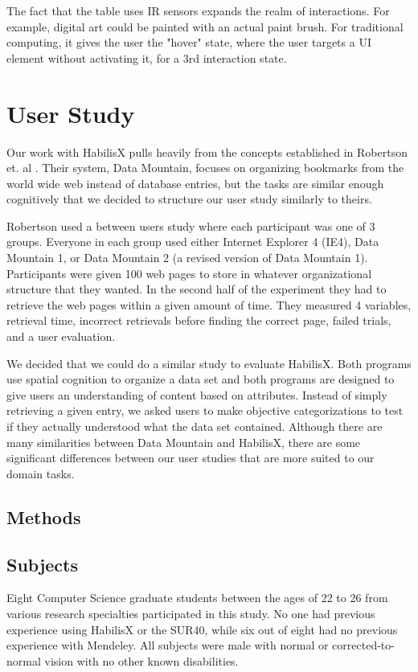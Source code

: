 \documentclass{article}
\begin{document}
The fact that the table uses IR sensors expands the realm of interactions.  For example, digital art could be painted with an actual paint brush.  For traditional computing, it gives the user the "hover" state, where the user targets a UI element without activating it, for a 3rd interaction state.  

\section{User Study}

Our work with HabilisX pulls heavily from the concepts established in Robertson et. al \cite{Robertson1998}.  Their system, Data Mountain, focuses on organizing bookmarks from the world wide web instead of database entries, but the tasks are similar enough cognitively that we decided to structure our user study similarly to theirs.  

Robertson used a between users study where each participant was one of 3 groups.  Everyone in each group used either Internet Explorer 4 (IE4), Data Mountain 1, or Data Mountain 2 (a revised version of Data Mountain 1).  Participants were given 100 web pages to store in whatever organizational structure that they wanted.  In the second half of the experiment they had to retrieve the web pages within a given amount of time.  They measured 4 variables, retrieval time, incorrect retrievals before finding the correct page, failed trials, and a user evaluation.  

We decided that we could do a similar study to evaluate HabilisX.  Both programs use spatial cognition to organize a data set and both programs are designed to give users an understanding of content based on attributes.  Instead of simply retrieving a given entry, we asked users to make objective categorizations to test if they actually understood what the data set contained.  Although there are many similarities between Data Mountain and HabilisX, there are some significant differences between our user studies that are more suited to our domain tasks.   








\subsection{Methods}
\subsection*{Subjects}
	Eight Computer Science graduate students between the ages of 22 to 26 from various research specialties participated in this study.  No one had previous experience using HabilisX or the SUR40, while six out of eight had no previous experience with Mendeley. All subjects were male with  normal or corrected-to-normal vision with no other known disabilities. 
\end{document}
